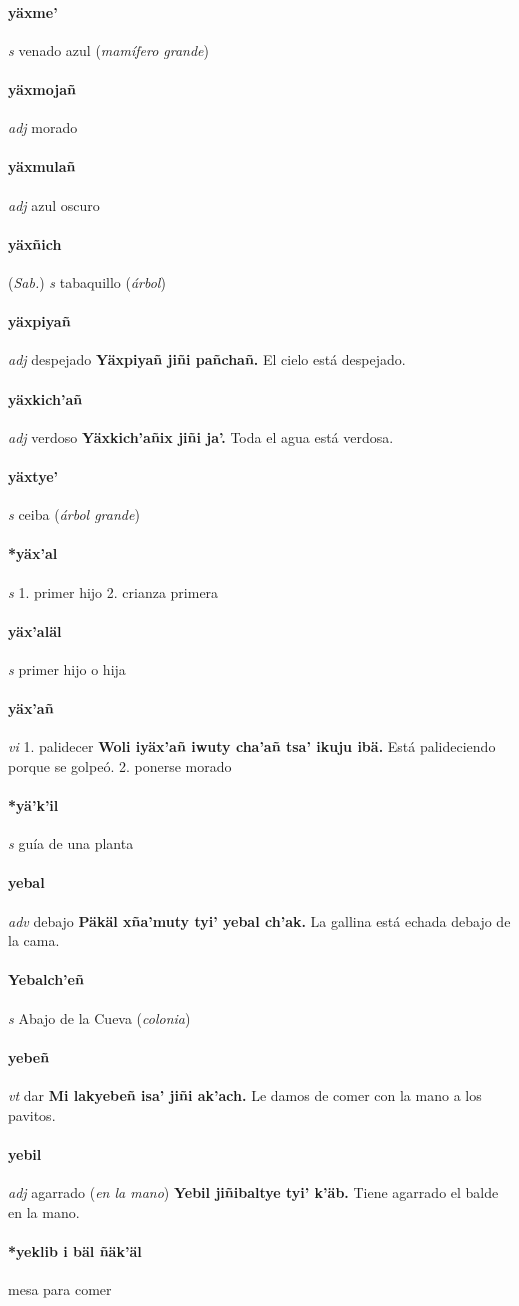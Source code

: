 \documentclass{scrbook}
\newcommand{\entry}[1]{\paragraph{#1}}
\newcommand{\onedefinition}[1]{#1.}
\newcommand{\partofspeech}[1]{\textit{#1}}
\newcommand{\spanishtranslation}[1]{#1}
\newcommand{\clarification}[1]{(\textit{#1})}
\newcommand{\cholexample}[1]{\textbf{#1}}
\newcommand{\exampletranslation}[1]{#1}
\newcommand{\relevantdialect}[1]{(\textit{#1})}
\begin{document}
\begin{multicols}{2}
\entry{yäxme'}
\partofspeech{s}
\spanishtranslation{venado azul}
\clarification{mamífero grande}

\entry{yäxmojañ}
\partofspeech{adj}
\spanishtranslation{morado}

\entry{yäxmulañ}
\partofspeech{adj}
\spanishtranslation{azul oscuro}

\entry{yäxñich}
\relevantdialect{Sab.}
\partofspeech{s}
\spanishtranslation{tabaquillo}
\clarification{árbol}

\entry{yäxpiyañ}
\partofspeech{adj}
\spanishtranslation{despejado}
\cholexample{Yäxpiyañ jiñi pañchañ.}
\exampletranslation{El cielo está despejado.}

\entry{yäxkich'añ}
\partofspeech{adj}
\spanishtranslation{verdoso}
\cholexample{Yäxkich'añix jiñi ja'.}
\exampletranslation{Toda el agua está verdosa.}

\entry{yäxtye'}
\partofspeech{s}
\spanishtranslation{ceiba}
\clarification{árbol grande}

\entry{*yäx'al}
\partofspeech{s}
\onedefinition{1}
\spanishtranslation{primer hijo}
\onedefinition{2}
\spanishtranslation{crianza primera}

\entry{yäx'aläl}
\partofspeech{s}
\spanishtranslation{primer hijo o hija}

\entry{yäx'añ}
\partofspeech{vi}
\onedefinition{1}
\spanishtranslation{palidecer}
\cholexample{Woli iyäx'añ iwuty cha'añ tsa' ikuju ibä.}
\exampletranslation{Está palideciendo porque se golpeó.}
\onedefinition{2}
\spanishtranslation{ponerse morado}

\entry{*yä'k'il}
\partofspeech{s}
\spanishtranslation{guía de una planta}

\entry{yebal}
\partofspeech{adv}
\spanishtranslation{debajo}
\cholexample{Päkäl xña'muty tyi' yebal ch'ak.}
\exampletranslation{La gallina está echada debajo de la cama.}

\entry{Yebalch'eñ}
\partofspeech{s}
\spanishtranslation{Abajo de la Cueva}
\clarification{colonia}

\entry{yebeñ}
\partofspeech{vt}
\spanishtranslation{dar}
\cholexample{Mi lakyebeñ isa' jiñi ak'ach.}
\exampletranslation{Le damos de comer con la mano a los pavitos.}

\entry{yebil}
\partofspeech{adj}
\spanishtranslation{agarrado}
\clarification{en la mano}
\cholexample{Yebil jiñibaltye tyi' k'äb.}
\exampletranslation{Tiene agarrado el balde en la mano.}

\entry{*yeklib i bäl ñäk'äl}
\spanishtranslation{mesa para comer}


\end{multicols}
\end{document}
